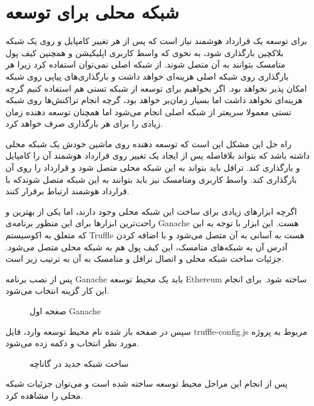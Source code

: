 \section{شبکه محلی برای توسعه}
برای توسعه یک قرارداد هوشمند نیاز است که پس از هر تغییر کامپایل و روی یک شبکه بلاکچین بارگذاری شود، به نحوی که واسط کاربری اپلیکیشن و همچنین کیف پول متامسک بتوانند به آن متصل شوند.
از شبکه اصلی نمی‌توان استفاده کرد زیرا هر بارگذاری روی شبکه اصلی هزینه‌ای خواهد داشت و بارگذاری‌های پیاپی روی شبکه امکان پذیر نخواهد بود.
اگر بخواهیم برای توسعه از شبکه تستی هم استفاده کنیم گرچه هزینه‌ای نخواهد داشت اما بسیار زمان‌بر خواهد بود، گرچه انجام تراکنش‌ها روی شبکه تستی معمولا سریعتر از شبکه اصلی انجام می‌شود اما همچنان توسعه دهنده زمان زیادی را برای هر بارگذاری صرف خواهد کرد.

راه حل این مشکل این است که توسعه دهنده روی ماشین خودش یک شبکه محلی داشته باشد که بتواند بلافاصله پس از ایجاد یک تغییر روی قرارداد هوشمند آن را کامپایل و بارگذاری کند. ترافل باید بتواند به این شبکه محلی متصل شود و قرارداد را روی آن بارگذاری کند. واسط کاربری ومتامسک نیز باید بتوانند به این شبکه متصل شوندکه با قرارداد هوشمند ارتباط برقرار کنند.

اگرچه ابزارهای زیادی برای ساخت این شبکه محلی وجود دارند، اما یکی از بهترین و راحت‌ترین ابزارها برای این منظور برنامه‌ی Ganache هست. این ابزار با توجه به این که متعلق به اکوسیستم Truffle هست به آسانی به آن متصل می‌شود و با اضافه کردن آدرس آن به شبکه‌های متامسک، این کیف پول هم به شبکه محلی متصل می‌شود. جزئیات ساخت شبکه محلی و اتصال ترافل و متامسک به آن به ترتیب زیر است.

پس از نصب برنامه Ganache باید یک محیط توسعه Ethereum ساخته شود. برای انجام این کار گزینه
انتخاب می‌شود.

\begin{figure}[ht]
\centerline{}
\caption{صغحه اول Ganache}
\label{fig:ganache-1}
\end{figure}

سپس در صفحه باز شده نام محیط توسعه وارد،  فایل truffle-config.js مربوط به پروژه مورد نظر انتخاب و دکمه
زده می‌شود.

\begin{figure}[ht]
\centerline{}
\caption{ساخت شبکه جدید در گاناچه}
\label{fig:ganache-2}
\end{figure}

پس از انجام این مراحل محیط توسعه ساخته شده است و می‌توان جزئیات شبکه محلی را مشاهده کرد.

